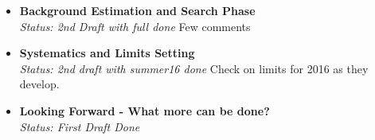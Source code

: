 \begin{itemize}
\item \textbf{Background Estimation and Search Phase}\\

\textit{Status: 2nd Draft with full done}
Few comments

\item \textbf{Systematics and Limits Setting}\\

\textit{Status: 2nd draft with summer16 done}
Check on limits for 2016 as they develop.

\item \textbf{Looking Forward - What more can be done?}\\

\textit{Status: First Draft Done}

\end{itemize}

